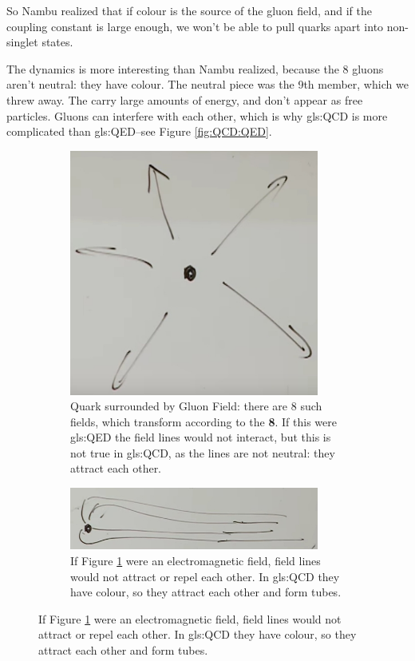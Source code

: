 \documentclass[]{article}
\begin{document}
So Nambu realized that if colour is the source of the gluon field, and if the coupling constant is large enough, we won't be able to pull quarks apart into non-singlet states.

The dynamics is more interesting than Nambu realized, because the 8 gluons aren't neutral: they have colour. The neutral piece was the 9th member, which we threw away. The carry large amounts of energy, and don't appear as free particles. Gluons can interfere with each other, which is why \gls{gls:QCD} is more complicated than \gls{gls:QED}--see Figure \ref{fig:QCD:QED}.
 
\begin{figure}[H]
	\caption{Why \gls{gls:QCD} is more complicated than \gls{gls:QED}}\label{fig:QCD:QED}
	\begin{subfigure}[t]{0.45\textwidth}
		\caption[Quark surrounded by Gluon Field]{Quark surrounded by Gluon Field: there are 8 such fields, which transform according to the {\bfseries 8}. If this were \gls{gls:QED} the field lines would not interact, but this is not true in \gls{gls:QCD}, as the lines are not neutral: they attract each other.}\label{fig:2-4-quark-gluon-field}
		\includegraphics[width=0.9\textwidth]{2-4-quark-gluon-field}
	\end{subfigure}
	\hfill
	\begin{subfigure}[t]{0.45\textwidth}
		\caption{If Figure \ref{fig:2-4-quark-gluon-field} were an electromagnetic field, field lines would not attract or repel each other. In \gls{gls:QCD} they have colour, so they attract each other and form tubes.}
		\includegraphics[width=0.9\textwidth]{2-4-quark-gluon-field-tubes}
	\end{subfigure}
	

\end{figure}
\end{document}
